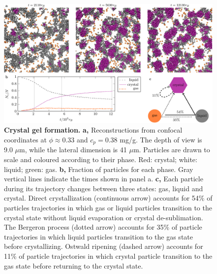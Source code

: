 \documentclass[preprint,amsmath,amssymb,superscriptaddress]{revtex4-1}
\begin{document}

\begin{figure}
 \centering
 \includegraphics[width=12cm]{transitions}
 \caption{{\bf Crystal gel formation.}  
{\bf a,} Reconstructions from confocal coordinates at $\phi\approx 0.33$ and $c_p=0.38$ mg/g. The depth of view is 9.0 $\mu$m, while the lateral dimension is 41 $\mu$m. Particles are drawn to scale and coloured according to their phase. Red: crystal; white: liquid; green: gas.
{\bf b,} Fraction of particles for each phase. Gray vertical lines indicate the times shown in panel a. 
{\bf c,} Each particle during its trajectory changes between three states: gas, liquid and crystal. Direct crystallization (continuous arrow) accounts for 54\% of particles trajectories in which
gas or liquid particles transition to the crystal state without liquid evaporation or crystal de-sublimation. The Bergeron process (dotted arrow) accounts for 35\% of particle trajectories in which liquid particles
transition to the gas state before crystallizing. Ostwald ripening (dashed arrow) accounts for 11\% of particle trajectories in which crystal particle transition to the gas state before returning
to the crystal state.}
\label{fig:transitions}
\end{figure}
\end{document}
